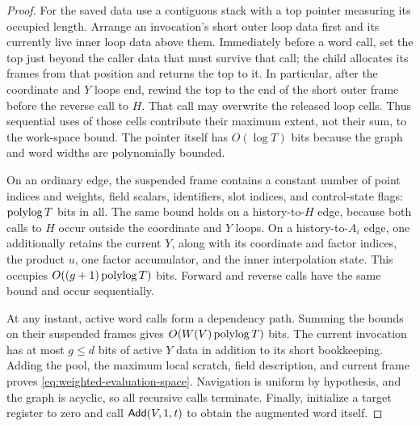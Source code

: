 \begin{proof}
For the saved data use a contiguous stack with a top pointer measuring its
occupied length.  Arrange an invocation's short outer loop data first and its
currently live inner loop data above them.  Immediately before a word call,
set the top just beyond the caller data that must survive that call; the child
allocates its frames from that position and returns the top to it.  In
particular, after the coordinate
and $Y$ loops end, rewind the top to the end of the short outer frame before
the reverse call to $H$.  That call may overwrite the released loop cells.
Thus sequential uses of those cells contribute their maximum extent, not
their sum, to the work-space bound.  The pointer itself has $O(\log T)$ bits
because the graph and word widths are polynomially bounded.

On an ordinary edge, the suspended frame contains a constant number of
point indices and weights, field scalars, identifiers, slot indices, and
control-state flags: $\operatorname{polylog} T$ bits in all.  The same bound holds on a
history-to-$H$ edge, because both calls to $H$ occur outside the coordinate
and $Y$ loops.  On a history-to-$A_i$ edge, one additionally retains the
current $Y$, along with its coordinate and factor indices, the product $u$,
one factor accumulator, and the inner interpolation state.  This occupies
$O((g+1)\operatorname{polylog} T)$ bits.  Forward and reverse calls have the same bound
and occur sequentially.

At any instant, active word calls form a dependency path.  Summing the
bounds on their suspended frames gives $O(W(V)\operatorname{polylog} T)$ bits.  The
current invocation has at most $g\le d$ bits of active $Y$ data in addition
to its short bookkeeping.  Adding the pool, the maximum local scratch,
field description, and current frame proves
\eqref{eq:weighted-evaluation-space}.  Navigation is uniform by hypothesis,
and the graph is acyclic, so all recursive calls terminate.  Finally,
initialize a target register to zero and call $\mathsf{Add}(V,1,t)$ to obtain the
augmented word itself.
\end{proof}
